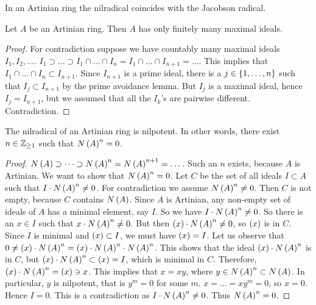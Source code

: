\begin{corollary}
\label{cor:12.8}
In an Artinian ring the nilradical coincides with the Jacobson radical.
\end{corollary}

\begin{lemma}
\label{lem:12.9}
Let $ A $ be an Artinian ring. Then $ A $ has only finitely many maximal ideals.
\end{lemma}

\begin{proof}
For contradiction suppose we have countably many maximal ideals $ I_1, I_2, \dots $. $ I_1 \supset \dots \supset I_1 \cap \dots \cap I_n = I_1 \cap \dots \cap I_{n + 1} = \dots $. This implies that $ I_1 \cap \dots \cap I_n \subset I_{n + 1} $. Since $ I_{n + 1} $ is a prime ideal, there is a $ j \in \cbr{1, \dots, n} $ such that $ I_j \subset I_{n + 1} $ by the prime avoidance lemma. But $ I_j $ is a maximal ideal, hence $ I_j = I_{n + 1} $, but we assumed that all the $ I_k $'s are pairwise different. Contradiction.
\end{proof}

\begin{lemma}
\label{lem:12.10}
The nilradical of an Artinian ring is nilpotent. In other words, there exist $ n \in \mathbb{Z}_{\ge 1} $ such that $ N\br{A}^n = 0 $.
\end{lemma}

\begin{proof}
$ N\br{A} \supset \dots \supset N\br{A}^n = N\br{A}^{n + 1} = \dots $. Such an $ n $ exists, because $ A $ is Artinian. We want to show that $ N\br{A}^n = 0 $. Let $ C $ be the set of all ideals $ I \subset A $ such that $ I \cdot N\br{A}^n \ne 0 $. For contradiction we assume $ N\br{A}^n \ne 0 $. Then $ C $ is not empty, because $ C $ contains $ N\br{A} $. Since $ A $ is Artinian, any non-empty set of ideals of $ A $ has a minimal element, say $ I $. So we have $ I \cdot N\br{A}^n \ne 0 $. So there is an $ x \in I $ such that $ x \cdot N\br{A}^n \ne 0 $. But then $ \br{x} \cdot N\br{A}^n \ne 0 $, so $ \br{x} $ is in $ C $. Since $ I $ is minimal and $ \br{x} \subset I $, we must have $ \br{x} = I $. Let us observe that $ 0 \ne \br{x} \cdot N\br{A}^n = \br{x} \cdot N\br{A}^n \cdot N\br{A}^n $. This shows that the ideal $ \br{x} \cdot N\br{A}^n $ is in $ C $, but $ \br{x} \cdot N\br{A}^n \subset \br{x} = I $, which is minimal in $ C $. Therefore, $ \br{x} \cdot N\br{A}^n = \br{x} \ni x $. This implies that $ x = xy $, where $ y \in N\br{A}^n \subset N\br{A} $. In particular, $ y $ is nilpotent, that is $ y^m = 0 $ for some $ m $. $ x = \dots = xy^m = 0 $, so $ x = 0 $. Hence $ I = 0 $. This is a contradiction as $ I \cdot N\br{A}^n \ne 0 $. Thus $ N\br{A}^n = 0 $.
\end{proof}

